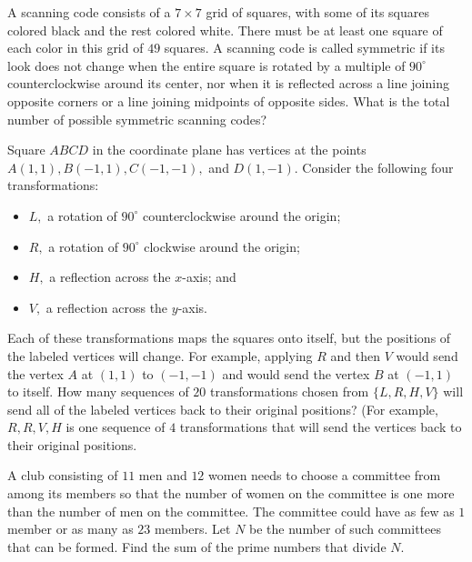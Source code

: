 \documentclass[mast]{lucky}
\begin{document}
     \begin{prob}[AMC 10A 2018/20]{3}
A scanning code consists of a $7 \times 7$ grid of squares, with some of its squares colored black and the rest colored white. There must be at least one square of each color in this grid of $49$ squares. A scanning code is called symmetric if its look does not change when the entire square is rotated by a multiple of $90 ^{\circ}$ counterclockwise around its center, nor when it is reflected across a line joining opposite corners or a line joining midpoints of opposite sides. What is the total number of possible symmetric scanning codes?
\end{prob}

     \begin{req}[AMC 10B 2020/23]{3}
Square $ABCD$ in the coordinate plane has vertices at the points $A(1,1), B(-1,1), C(-1,-1),$ and $D(1,-1).$ Consider the following four transformations:
    
\begin{itemize}
    \item $L,$ a rotation of $90^{\circ}$ counterclockwise around the origin;

    \item $R,$ a rotation of $90^{\circ}$ clockwise around the origin;
    
    \item $H,$ a reflection across the $x$-axis; and

    \item $V,$ a reflection across the $y$-axis.
\end{itemize}

Each of these transformations maps the squares onto itself, but the positions of the labeled vertices will change. For example, applying $R$ and then $V$ would send the vertex $A$ at $(1,1)$ to $(-1,-1)$ and would send the vertex $B$ at $(-1,1)$ to itself. How many sequences of $20$ transformations chosen from $\{L, R, H, V\}$ will send all of the labeled vertices back to their original positions? (For example, $R, R, V, H$ is one sequence of $4$ transformations that will send the vertices back to their original positions.
\end{req}

\begin{req}[AIME I 2020/7]{3}
A club consisting of $11$ men and $12$ women needs to choose a committee from among its members so that the number of women on the committee is one more than the number of men on the committee. The committee could have as few as $1$ member or as many as $23$ members. Let $N$ be the number of such committees that can be formed. Find the sum of the prime numbers that divide $N.$
\end{req}
    
\end{document}
